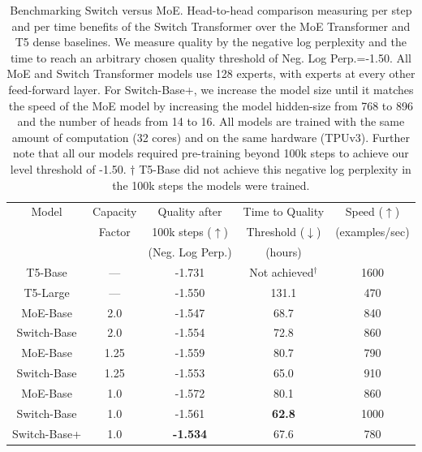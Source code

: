 \documentclass[twoside,11pt]{article}
\begin{document}
\begin{table}[!th]
\centering
\begin{tabular}{ccccc}
    \toprule
    Model & Capacity & Quality after & Time to Quality & Speed ($\uparrow$) \\ 
      & Factor & 100k steps ($\uparrow$) & Threshold ($\downarrow$) & (examples/sec) \\
      &  & (Neg. Log Perp.) & (hours) &  \\ \hline
    T5-Base & --- & -1.731 & Not achieved$^\dag$ & 1600 \\%
    T5-Large & --- & -1.550 & 131.1 & 470 \\ %
    \hline
    MoE-Base & 2.0 & -1.547 & 68.7 & 840 \\ %
    Switch-Base & 2.0 & -1.554 & 72.8 & 860 \\
    \hline
    MoE-Base & 1.25 & -1.559 & 80.7 & 790 \\%
    Switch-Base & 1.25 & -1.553 & 65.0 & 910 \\%
    \hline
    MoE-Base & 1.0 & -1.572 & 80.1 & 860 \\%
    Switch-Base & 1.0 & -1.561 & \textbf{62.8} & 1000 \\ %
    Switch-Base+ & 1.0 & \textbf{-1.534} & 67.6 & 780 \\
    \bottomrule
\end{tabular}
\caption{Benchmarking Switch versus MoE. Head-to-head comparison measuring per step and per time benefits of the Switch Transformer over the MoE Transformer and T5 dense baselines. We measure quality by the negative log perplexity and the time to reach an arbitrary chosen quality threshold of Neg. Log Perp.=-1.50. All MoE and Switch Transformer models use 128 experts, with experts at every other feed-forward layer. For Switch-Base+, we increase the model size until it matches the speed of the MoE model by increasing the model hidden-size from 768 to 896 and the number of heads from 14 to 16. All models are trained with the same amount of computation (32 cores) and on the same hardware (TPUv3). Further note that all our models required pre-training beyond 100k steps to achieve our level threshold of -1.50. $\dag$ T5-Base did not achieve this negative log perplexity in the 100k steps the models were trained.}
\label{tab:top1_vs_moe}
\end{table}
\end{document}
